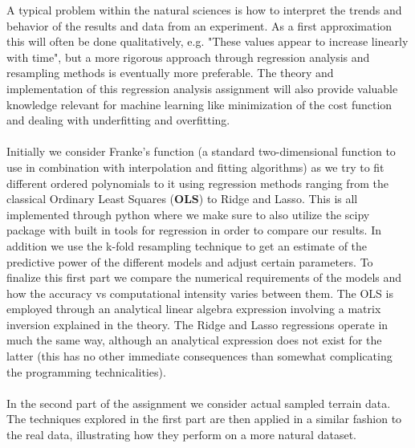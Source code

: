 A typical problem within the natural sciences is how to interpret the trends and behavior of the
results and data from an experiment. As a first approximation this will often be done qualitatively,
e.g. "These values appear to increase linearly with time", but a more rigorous approach through
regression analysis and resampling methods is eventually more preferable. The theory and implementation
of this regression analysis assignment will also provide valuable knowledge relevant for machine learning
like minimization of the cost function and dealing with underfitting and overfitting.
\\
\\
Initially we consider Franke's function (a standard two-dimensional function to use in
combination with interpolation and fitting algorithms) as we try to fit
different ordered polynomials to it using regression methods ranging from the classical
Ordinary Least Squares (\textbf{OLS}) to Ridge and Lasso. This is all implemented through
python where we make sure to also utilize the scipy package with built in tools for regression
in order to compare our results. In addition we use the k-fold resampling technique to get an
estimate of the predictive power of the different models and adjust certain parameters. To
finalize this first part we compare the numerical requirements of the models and how the
accuracy vs computational intensity varies between them. The OLS is employed through an
analytical linear algebra expression involving a matrix inversion explained in the theory.
The Ridge and Lasso regressions operate in much the same way, although an analytical
expression does not exist for the latter (this has no other immediate consequences than
somewhat complicating the programming technicalities).
\\
\\
In the second part of the assignment we consider actual sampled terrain data.
The techniques explored in the first part are then applied in a similar fashion
to the real data, illustrating how they perform on a more natural dataset.
